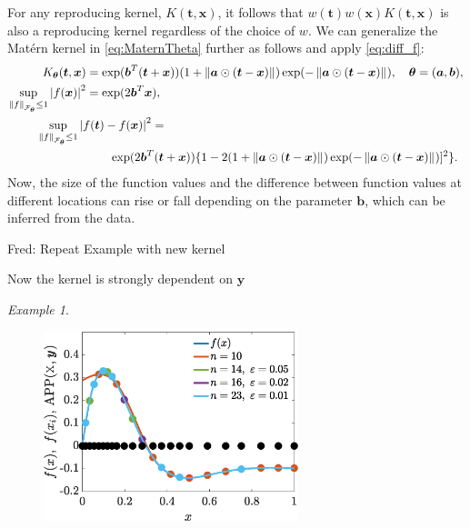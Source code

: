 \documentclass[]{mcom-l}
\theoremstyle{theorem}
\theoremstyle{remark}
\newtheorem{example}{Example}
\newcommand{\ba}{{\boldsymbol{a}}}
\newcommand{\bb}{{\boldsymbol{b}}}
\newcommand{\bx}{{\boldsymbol{x}}}
\newcommand{\by}{{\boldsymbol{y}}}
\newcommand{\bt}{{\boldsymbol{t}}}
\newcommand{\btheta}{{\boldsymbol{\theta}}}
\newcommand{\calf}{{\mathcal{F}}}
\def\abs#1{\ensuremath{\left \lvert #1 \right \rvert}}
\newcommand{\norm}[2][{}]{\ensuremath{\left \lVert #2 \right \rVert}_{#1}}
\newcommand{\FredNote}[1]{{\color{blue}Fred: #1}}
\begin{document}
For any reproducing kernel, $K(\bt ,\bx)$, it follows that $w(\bt)w(\bx)K(\bt ,\bx)$ is also a reproducing kernel regardless of the choice of $w$.  We can generalize the Mat\'ern kernel in \eqref{eq:MaternTheta} further as follows and apply \eqref{eq:diff_f}:
\begin{align} \label{eq:MaternAB}
K_\btheta(\bt,\bx) &= \exp(\bb^T(\bt + \bx))(1 +  \norm{\ba \odot (\bt-\bx)}) \exp(-\norm{\ba \odot (\bt-\bx)}),  \quad \btheta=(\ba, \bb), \\
\nonumber
\sup_{\norm[\calf_{\btheta}]{f} \le 1} \abs{f(\bx)}^2 &= \exp(2\bb^T\bx), \\
\nonumber
\MoveEqLeft[4]{\sup_{\norm[\calf_{\btheta}]{f} \le 1} \abs{f(\bt) - f(\bx)}^2} = \\
\nonumber 
& \qquad \exp(2\bb^T(\bt + \bx))\{ 1 - 2 (1 +  \norm{\ba \odot (\bt-\bx)}) \exp(-\norm{\ba \odot (\bt-\bx)})]^2\}.
\end{align}
Now, the size of the function values and the difference between function values at different locations can rise or fall depending on the parameter $\bb$, which can be inferred from the data.


\FredNote{Repeat Example with new kernel}

Now the kernel is strongly dependent on $\by$

\begin{example}
\label{ex:compfun2}
	\begin{figure}[H]
		\centering
		\includegraphics[height = 5.5cm]{ProgramsImages/Alg3_LeftPeakFun_SpatialMatern_adapt_th_EmpBayesAx_theta_1.eps} 
		\caption{ \label{fig:ex5}}
	\end{figure}

		
	


\end{example}
\end{document}
